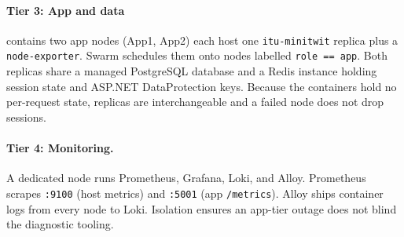 \paragraph{Tier 3: App and data} contains two app nodes (App1, App2) each host one \texttt{itu-minitwit} replica
plus a \texttt{node-exporter}. Swarm schedules them onto nodes labelled \texttt{role == app}. 
Both replicas share a managed PostgreSQL database and a Redis instance holding session state 
and ASP.NET DataProtection keys. Because the containers hold no per-request state, replicas 
are interchangeable and a failed node does not drop sessions.

\paragraph{Tier 4: Monitoring.} A dedicated node runs Prometheus, Grafana, Loki, and Alloy. Prometheus 
scrapes \texttt{:9100} (host metrics) and \texttt{:5001} (app \texttt{/metrics}). Alloy ships container 
logs from every node to Loki. Isolation ensures an app-tier outage does not blind the diagnostic tooling.

